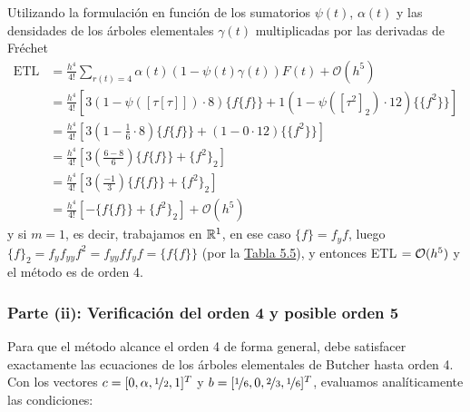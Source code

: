 \begin{sol}
Utilizando la formulación en función de los sumatorios $\psi(t)$, $\alpha(t)$ y las densidades de los árboles elementales $\gamma(t)$ multiplicadas por las derivadas de Fréchet
\begin{align*}
\text{ETL} & = \frac{h^4}{4!} \sum_{r(t)=4} \alpha(t) \left( 1-\psi(t) \gamma(t) \right) F(t) + \mathcal{O}(h^5) \\
&= \frac{h^4}{4!}  \left[ 3 \left( 1- \psi ([\tau[\tau]]) \cdot 8 \right) \{f\{f\}\} + 1 \left(  1 -\psi ([\tau^2]_2) \cdot 12 \right)\{\{f^2\}\} \right] \\
&= \frac{h^4}{4!}  \left[ 3 \left( 1- \frac{1}{6} \cdot 8 \right) \{f\{f\}\} + \left( 1- 0 \cdot 12 \right)\{\{f^2\}\} \right] \\
&= \frac{h^4}{4!}  \left[ 3 \left( \frac{6-8}{6}  \right) \{f\{f\}\} +  \{f^2\}_2 \right] \\
&= \frac{h^4}{4!}  \left[ 3 \left( \frac{-1}{3}  \right) \{f\{f\}\} +  \{f^2\}_2 \right] \\
&= \frac{h^4}{4!}  \left[ - \{f\{f\}\} + \{f^2\}_2 \right] + \mathcal{O}(h^5)
\end{align*}
y si $m=1$, es decir, trabajamos en $\mathbb{R}^1$, en ese caso $\{f\} = f_y f$, luego $\{f\}_2 = f_y f_{yy} f^2 = f_{yy} f f_{y} f = \{f\{f\}\}$ (por la \hyperref[ap1]{Tabla 5.5}), y entonces ETL $= \mathcal{O}(h^5)$ y el m\'etodo es de orden 4. 

\subsubsection*{Parte (ii): Verificación del orden 4 y posible orden 5}
Para que el método alcance el orden 4 de forma general, debe satisfacer exactamente las ecuaciones de los árboles elementales de Butcher hasta orden 4. Con los vectores $c = [0, \alpha, \nicefrac{1}{2}, 1]^T$ y $b = [\nicefrac{1}{6}, 0, \nicefrac{2}{3}, \nicefrac{1}{6}]^T$, evaluamos analíticamente las condiciones:


\end{sol}
